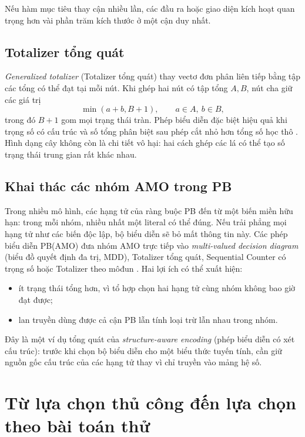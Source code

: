 Nếu hàm mục tiêu thay cận nhiều lần, các đầu ra hoặc giao diện kích hoạt quan
trọng hơn vài phần trăm kích thước ở một cận duy nhất.

\subsection{Totalizer tổng quát}

\emph{Generalized totalizer} (Totalizer tổng quát) thay vectơ đơn phân liên tiếp
bằng tập các tổng có thể đạt tại mỗi nút. Khi ghép hai nút có tập tổng \(A,B\),
nút cha giữ các giá trị
\[
  \min(a+b,B+1),\qquad a\in A,\ b\in B,
\]
trong đó \(B+1\) gom mọi trạng thái tràn. Phép biểu diễn đặc biệt hiệu quả khi
trọng số có cấu trúc và số tổng phân biệt sau phép cắt nhỏ hơn tổng số học thô
\parencite{joshi2015gte}. Hình dạng cây không còn là chi tiết vô hại: hai cách
ghép các lá có thể tạo số trạng thái trung gian rất khác nhau.

\subsection{Khai thác các nhóm AMO trong PB}

Trong nhiều mô hình, các hạng tử của ràng buộc PB đến từ một biến miền hữu hạn:
trong mỗi nhóm, nhiều nhất một literal có thể đúng. Nếu trải phẳng mọi hạng tử
như các biến độc lập, bộ biểu diễn sẽ bỏ mất thông tin này. Các phép biểu diễn
PB(AMO) đưa nhóm AMO trực tiếp vào \emph{multi-valued decision diagram}
(biểu đồ quyết định đa trị, MDD), Totalizer
tổng quát, Sequential Counter có trọng số hoặc Totalizer theo môđun
\parencite{bofill2022pbamo}. Hai lợi ích có thể xuất hiện:
\begin{itemize}
  \item ít trạng thái tổng hơn, vì tổ hợp chọn hai hạng tử cùng nhóm không bao
        giờ đạt được;
  \item lan truyền dùng được cả cận PB lẫn tính loại trừ lẫn nhau trong nhóm.
\end{itemize}

Đây là một ví dụ tổng quát của \emph{structure-aware encoding}
(phép biểu diễn có xét cấu trúc): trước khi chọn bộ biểu diễn cho một biểu thức
tuyến tính, cần giữ nguồn gốc cấu trúc của các hạng tử thay vì chỉ truyền vào
mảng hệ số.

\section{Từ lựa chọn thủ công đến lựa chọn theo bài toán thử}

